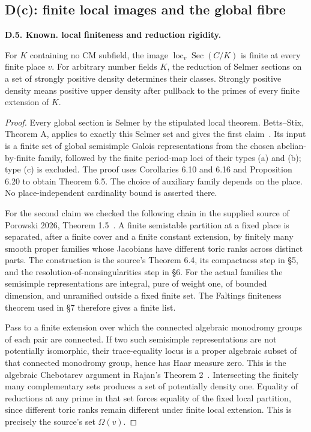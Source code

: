 \documentclass[11pt,oneside]{article}
\makeatletter
\newcounter{statementanchor}
\newenvironment{statement}[3]{%
 \refstepcounter{statementanchor}\def\@currentlabel{#1}%
 \par\addvspace{9pt}\noindent
 \textbf{#1. #2. #3.}\par\nobreak\noindent\ignorespaces
}{\par\addvspace{5pt}}
\makeatother
\begin{document}
\subsection{D(c): finite local images and the global fibre}

\begin{statement}{D.5}{Known}{local finiteness and reduction rigidity}
\label{st:D.5}
\label{D-rigidity}
For $K$ containing no CM subfield, the image
$\operatorname{loc}_v\operatorname{Sec}(C/K)$
is finite at every finite place $v$.
For arbitrary number fields $K$, the reduction
of Selmer sections on a set of strongly positive
density determines their classes. Strongly
positive density means positive upper density
after pullback to the primes of every finite
extension of $K$.
\end{statement}
\begin{proof}
Every global section is Selmer by the stipulated
local theorem. Betts--Stix, Theorem A, applies
to exactly this Selmer set and gives the first
claim~\cite{BettsStix2025}. Its input is a finite
set of global semisimple Galois representations
from the chosen abelian-by-finite family, followed
by the finite period-map loci of their types
(a) and (b); type (c) is excluded. The proof uses
Corollaries 6.10 and 6.16 and Proposition 6.20
to obtain Theorem 6.5. The choice of auxiliary
family depends on the place. No place-independent
cardinality bound is asserted there.

For the second claim we checked the following
chain in the supplied source of Porowski 2026,
Theorem 1.5~\cite{Porowski2026}. A finite
semistable partition at a fixed place is
separated, after a finite cover and a finite
constant extension, by finitely many smooth
proper families whose Jacobians have different
toric ranks across distinct parts. The
construction is the source's Theorem 6.4,
its compactness step in \S5, and the
resolution-of-nonsingularities step in \S6.
For the actual families the semisimple
representations are integral, pure of weight
one, of bounded dimension, and unramified
outside a fixed finite set. The Faltings
finiteness theorem used in \S7 therefore
gives a finite list.

Pass to a finite extension over which the
connected algebraic monodromy groups of each
pair are connected. If two such semisimple
representations are not potentially isomorphic,
their trace-equality locus is a proper
algebraic subset of that connected monodromy
group, hence has Haar measure zero. This is
the algebraic Chebotarev argument in Rajan's
Theorem 2~\cite{Rajan1998}. Intersecting the
finitely many complementary sets produces a
set of potentially density one. Equality of
reductions at any prime in that set forces
equality of the fixed local partition, since
different toric ranks remain different under
finite local extension. This is precisely
the source's set $\Omega(v)$.


\end{proof}
\end{document}
